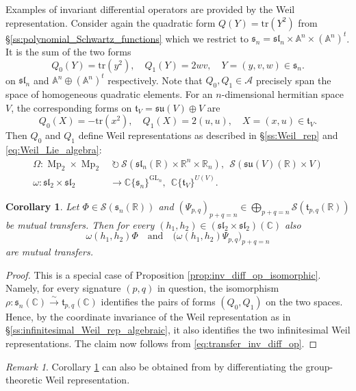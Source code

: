 \documentclass[reqno, 11pt]{amsart} %
\numberwithin{equation}{section}
\theoremstyle{plain}
\newtheorem{corollary}[theorem]{Corollary}
\theoremstyle{definition}
\theoremstyle{remark}
\newtheorem{remark}[theorem]{Remark}
\newcommand{\tr}{\mathrm{tr}}
\newcommand{\lr}{\longrightarrow}
\newcommand{\mbA}{\mathbb{A}}
\newcommand{\mbC}{\mathbb{C}}
\newcommand{\mbR}{\mathbb{R}}
\newcommand{\mcA}{\mathcal{A}}
\newcommand{\mcS}{\mathcal{S}}
\newcommand{\mfl}{\mathfrak{l}}
\newcommand{\mfs}{\mathfrak{s}}
\newcommand{\mft}{\mathfrak{t}}
\newcommand{\mfu}{\mathfrak{u}}
\newcommand{\mfsl}{\mfs\mfl}
\newcommand{\mfsu}{\mfs\mfu}
\newcommand{\simto}{\overset{\sim}{\to}}
\newcommand{\bbA}{\mathbb A}
\newcommand{\lie}[1]{ \mathfrak{#1}}
\DeclareMathOperator{\GL}{GL}
\DeclareMathOperator{\Mp}{Mp}
\begin{document}
Examples of invariant differential operators are provided by the Weil representation. Consider again the quadratic form $Q(Y) = \tr(Y^2)$ from \S\ref{ss:polynomial_Schwartz_functions} which we restrict to $\lie s_n = \mfsl_n\times \mbA^n\times (\mbA^n)^t$. It is the sum of the two forms
$$Q_0(Y) = \tr(y^2),\quad Q_1(Y) = 2wv,\quad Y = (y,v,w)\in \lie s_n.$$
on $\lie{sl}_n$ and $\bbA^n \oplus (\bbA^n)^t$ respectively. Note that $Q_0,Q_1\in \mcA$ precisely span the space of homogeneous quadratic elements. For an $n$-dimensional hermitian space $V$, the corresponding forms on $\lie t_V = \lie{su}(V) \oplus V$ are
$$Q_0(X) = -\tr(x^2),\quad Q_1(X) = 2(u,u),\quad X = (x,u)\in \lie t_V.$$
Then $Q_0$ and $Q_1$ define Weil representations as described in \S\ref{ss:Weil_rep} and \eqref{eq:Weil_Lie_algebra}:
\begin{equation}\label{eq:Omega_orb_ints}
\begin{aligned}
\Omega:\Mp_2\times \Mp_2 & \ \circlearrowright\ \mcS(\mfsl_n(\mbR)\times \mbR^n\times \mbR_n),\ \ \mcS(\mfsu(V)(\mbR)\times V)\\[1mm]
ω:\mfsl_2\times \mfsl_2 & \lr \mbC\{\mfs_n\}^{\GL_n},\ \ \mbC\{\mft_V\}^{U(V)}.
\end{aligned}
\end{equation}
\begin{corollary}\label{cor:Weil_rep_transfer}
Let $Φ \in \mcS(\mfs_n(\mbR))$ and $(Ψ_{p,q})_{p + q = n} \in \bigoplus_{p + q = n} \mcS(\mft_{p,q}(\mbR))$ be mutual transfers. Then for every $(h_1,h_2)\in (\mfsl_2\times \mfsl_2)(\mbC)$ also
\begin{equation}\label{eq:transfer_Weil_compatible}
ω(h_1, h_2)Φ\quad\text{and}\quad \big(ω(h_1,h_2)Ψ_{p,q}\big)_{p + q = n}
\end{equation}
are mutual transfers.
\end{corollary}
\begin{proof}
This is a special case of Proposition \ref{prop:inv_diff_op_isomorphic}. Namely, for every signature $(p,q)$ in question, the isomorphism $ρ:\mfs_n(\mbC)\simto \mft_{p,q}(\mbC)$ identifies the pairs of forms $(Q_0,Q_1)$ on the two spaces. Hence, by the coordinate invariance of the Weil representation as in \S\ref{ss:infinitesimal_Weil_rep_algebraic}, it also identifies the two infinitesimal Weil representations. The claim now follows from \eqref{eq:transfer_inv_diff_op}.
\end{proof}

\begin{remark}\label{rmk:use_Xue_instead} Corollary \ref{cor:Weil_rep_transfer} can also be obtained from \cite[Theorem 9.1]{Xue} by differentiating the group-theoretic Weil representation.
\end{remark}
\end{document}
